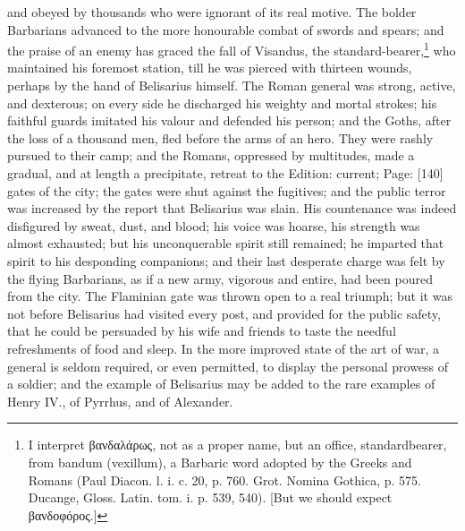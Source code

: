 and obeyed by thousands who were ignorant of its real motive. The bolder Barbarians advanced to the more honourable combat of swords and spears; and the praise of an enemy has graced the fall of Visandus, the standard-bearer,\footnote{I interpret \textgreek{βανδαλάρως}, not as a proper name, but an office, standardbearer, from bandum (vexillum), a Barbaric word adopted by the Greeks and Romans (Paul Diacon. l. i. c. 20, p. 760. Grot. Nomina Gothica, p. 575. Ducange, Gloss. Latin. tom. i. p. 539, 540). [But we should expect \textgreek{βανδοφόρος}.]} who maintained his foremost station, till he was pierced with thirteen wounds, perhaps by the hand of Belisarius himself. The Roman general was strong, active, and dexterous; on every side he discharged his weighty and mortal strokes; his faithful guards imitated his valour and defended his person; and the Goths, after the loss of a thousand men, fled before the arms of an hero. They were rashly pursued to their camp; and the Romans, oppressed by multitudes, made a gradual, and at length a precipitate, retreat to the Edition: current; Page: [140] gates of the city; the gates were shut against the fugitives; and the public terror was increased by the report that Belisarius was slain. His countenance was indeed disfigured by sweat, dust, and blood; his voice was hoarse, his strength was almost exhausted; but his unconquerable spirit still remained; he imparted that spirit to his desponding companions; and their last desperate charge was felt by the flying Barbarians, as if a new army, vigorous and entire, had been poured from the city. The Flaminian gate was thrown open to a real triumph; but it was not before Belisarius had visited every post, and provided for the public safety, that he could be persuaded by his wife and friends to taste the needful refreshments of food and sleep. In the more improved state of the art of war, a general is seldom required, or even permitted, to display the personal prowess of a soldier; and the example of Belisarius may be added to the rare examples of Henry IV., of Pyrrhus, and of Alexander.

